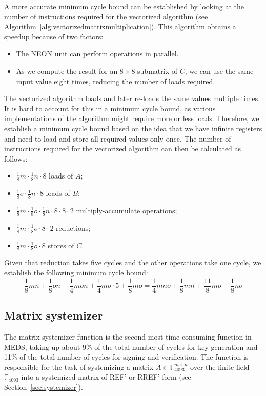 \documentclass[11pt,a4paper]{report}
\theoremstyle{definition}
\begin{document}
A more accurate minimum cycle bound can be established by looking at the number of instructions required for the vectorized algorithm (see Algorithm~\ref{alg:vectorizedmatrixmultiplication}). This algorithm obtains a speedup because of two factors:
\begin{itemize}
  \item The NEON unit can perform operations in parallel.
  \item As we compute the result for an $8\times8$ submatrix of $C$, we can use the same input value eight times, reducing the number of loads required.
\end{itemize}
The vectorized algorithm loads and later re-loads the same values multiple times. It is hard to account for this in a minimum cycle bound, as various implementations of the algorithm might require more or less loads. Therefore, we establish a minimum cycle bound based on the idea that we have infinite registers and need to load and store all required values only once. The number of instructions required for the vectorized algorithm can then be calculated as follows:
\begin{itemize}
  \item $\frac{1}{8}m \cdot \frac{1}{8}n \cdot 8$ loads of $A$;
  \item $\frac{1}{8}o \cdot \frac{1}{8}n \cdot 8$ loads of $B$;
  \item $\frac{1}{8}m \cdot \frac{1}{8}o \cdot \frac{1}{8}n \cdot 8 \cdot 8 \cdot 2$ multiply-accumulate operations;
  \item $\frac{1}{8}m \cdot \frac{1}{8}o \cdot 8 \cdot 2$ reductions;
  \item $\frac{1}{8}m \cdot \frac{1}{8}o \cdot 8$ stores of $C$.
\end{itemize}
Given that reduction takes five cycles and the other operations take one cycle, we establish the following minimum cycle bound:
\[
  \frac{1}{8}mn + \frac{1}{8}on + \frac{1}{4}mon + \frac{1}{4}mo \cdot 5 + \frac{1}{8}mo = \frac{1}{4}mno + \frac{1}{8}mn + \frac{11}{8}mo + \frac{1}{8}no
\]

\subsection{Matrix systemizer}
\label{sec:matrixsystemizer}
The matrix systemizer function is the second most time-consuming function in MEDS, taking up about 9\% of the total number of cycles for key generation and 11\% of the total number of cycles for signing and verification. The function is responsible for the task of systemizing a matrix $A \in \mathbb{F}_{4093}^{m \times n}$ over the finite field $\mathbb{F}_{4093}$ into a systemized matrix of REF' or RREF' form (see Section~\ref{sec:systemizer}).
\end{document}
